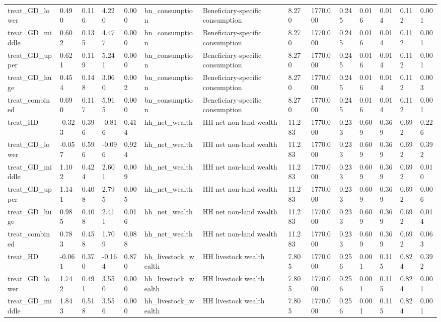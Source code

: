 \begin{tabular}{llllllllllllll}
treat\_GD\_lower & 0.490 & 0.116 & 4.220 & 0.000 & bn\_consumption & Beneficiary-specific consumption & 8.270 & 1770.000 & 0.245 & 0.016 & 0.014 & 0.112 & 0.001 \\
treat\_GD\_middle & 0.602 & 0.135 & 4.477 & 0.000 & bn\_consumption & Beneficiary-specific consumption & 8.270 & 1770.000 & 0.245 & 0.016 & 0.014 & 0.112 & 0.001 \\
treat\_GD\_upper & 0.621 & 0.119 & 5.241 & 0.000 & bn\_consumption & Beneficiary-specific consumption & 8.270 & 1770.000 & 0.245 & 0.016 & 0.014 & 0.112 & 0.001 \\
treat\_GD\_huge & 0.454 & 0.148 & 3.060 & 0.002 & bn\_consumption & Beneficiary-specific consumption & 8.270 & 1770.000 & 0.245 & 0.016 & 0.014 & 0.112 & 0.003 \\
treat\_combined & 0.690 & 0.117 & 5.915 & 0.000 & bn\_consumption & Beneficiary-specific consumption & 8.270 & 1770.000 & 0.245 & 0.016 & 0.014 & 0.112 & 0.001 \\
treat\_HD & -0.323 & 0.396 & -0.816 & 0.414 & hh\_net\_wealth & HH net non-land wealth & 11.283 & 1770.000 & 0.233 & 0.609 & 0.369 & 0.692 & 0.226 \\
treat\_GD\_lower & -0.057 & 0.596 & -0.096 & 0.924 & hh\_net\_wealth & HH net non-land wealth & 11.283 & 1770.000 & 0.233 & 0.609 & 0.369 & 0.692 & 0.392 \\
treat\_GD\_middle & 1.102 & 0.424 & 2.601 & 0.009 & hh\_net\_wealth & HH net non-land wealth & 11.283 & 1770.000 & 0.233 & 0.609 & 0.369 & 0.692 & 0.010 \\
treat\_GD\_upper & 1.141 & 0.408 & 2.795 & 0.005 & hh\_net\_wealth & HH net non-land wealth & 11.283 & 1770.000 & 0.233 & 0.609 & 0.369 & 0.692 & 0.006 \\
treat\_GD\_huge & 0.985 & 0.408 & 2.411 & 0.016 & hh\_net\_wealth & HH net non-land wealth & 11.283 & 1770.000 & 0.233 & 0.609 & 0.369 & 0.692 & 0.014 \\
treat\_combined & 0.783 & 0.458 & 1.709 & 0.088 & hh\_net\_wealth & HH net non-land wealth & 11.283 & 1770.000 & 0.233 & 0.609 & 0.369 & 0.692 & 0.063 \\
treat\_HD & -0.061 & 0.370 & -0.164 & 0.870 & hh\_livestock\_wealth & HH livestock wealth & 7.805 & 1770.000 & 0.256 & 0.001 & 0.115 & 0.824 & 0.392 \\
treat\_GD\_lower & 1.742 & 0.491 & 3.550 & 0.000 & hh\_livestock\_wealth & HH livestock wealth & 7.805 & 1770.000 & 0.256 & 0.001 & 0.115 & 0.824 & 0.001 \\
treat\_GD\_middle & 1.843 & 0.518 & 3.556 & 0.000 & hh\_livestock\_wealth & HH livestock wealth & 7.805 & 1770.000 & 0.256 & 0.001 & 0.115 & 0.824 & 0.001 \\

\end{tabular}
